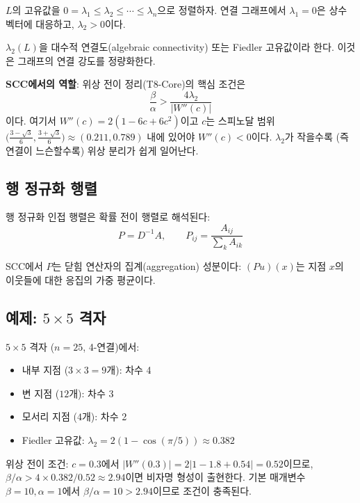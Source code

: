 $L$의 고유값을 $0 = \lambda_1 \leq \lambda_2 \leq \cdots \leq \lambda_n$으로 정렬하자. 연결 그래프에서 $\lambda_1 = 0$은 상수 벡터에 대응하고, $\lambda_2 > 0$이다.

\begin{definition}
$\lambda_2(L)$을 대수적 연결도(algebraic connectivity) 또는 Fiedler 고유값이라 한다. 이것은 그래프의 연결 강도를 정량화한다.
\end{definition}

\textbf{SCC에서의 역할}: 위상 전이 정리(T8-Core)의 핵심 조건은
\begin{equation}
    \frac{\beta}{\alpha} > \frac{4\lambda_2}{|W''(c)|}
    \label{eq:phase-transition-condition}
\end{equation}
이다. 여기서 $W''(c) = 2(1 - 6c + 6c^2)$이고 $c$는 스피노달 범위 $\big(\frac{3-\sqrt{3}}{6}, \frac{3+\sqrt{3}}{6}\big) \approx (0.211, 0.789)$ 내에 있어야 $W''(c) < 0$이다. $\lambda_2$가 작을수록 (즉 연결이 느슨할수록) 위상 분리가 쉽게 일어난다.


\subsection{행 정규화 행렬}

행 정규화 인접 행렬은 확률 전이 행렬로 해석된다:
\begin{equation}
    P = D^{-1}A, \qquad P_{ij} = \frac{A_{ij}}{\sum_k A_{ik}}
    \label{eq:row-normalized}
\end{equation}

SCC에서 $P$는 닫힘 연산자의 집계(aggregation) 성분이다: $(Pu)(x)$는 지점 $x$의 이웃들에 대한 응집의 가중 평균이다.


\subsection{예제: $5 \times 5$ 격자}

$5 \times 5$ 격자 ($n = 25$, 4-연결)에서:
\begin{itemize}
    \item 내부 지점 ($3 \times 3 = 9$개): 차수 4
    \item 변 지점 ($12$개): 차수 3
    \item 모서리 지점 ($4$개): 차수 2
    \item Fiedler 고유값: $\lambda_2 = 2(1 - \cos(\pi/5)) \approx 0.382$
\end{itemize}

위상 전이 조건: $c = 0.3$에서 $|W''(0.3)| = 2|1 - 1.8 + 0.54| = 0.52$이므로, $\beta/\alpha > 4 \times 0.382/0.52 \approx 2.94$이면 비자명 형성이 출현한다. 기본 매개변수 $\beta = 10, \alpha = 1$에서 $\beta/\alpha = 10 > 2.94$이므로 조건이 충족된다.


